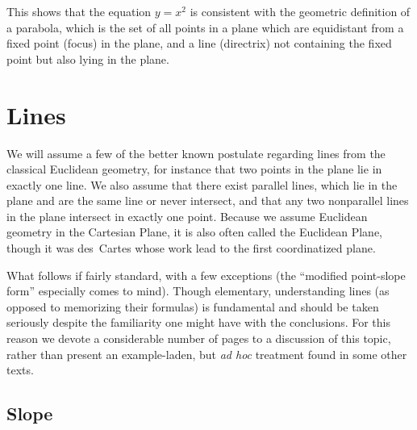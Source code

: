 This shows that the equation $y=x^2$ is consistent with the 
geometric definition of a parabola, which is the set of 
all points in a plane which are equidistant from a fixed
point (focus) in the plane, and a line (directrix) not containing
the fixed point but also lying in the plane.  
\ehw



\newpage
\section{Lines}
We will assume a few of the better known postulate regarding lines
from the classical Euclidean geometry, for instance that 
two points in the plane lie in exactly one line. We also assume that
there exist parallel lines, which lie in the
plane and are the same line or never intersect, and that any
two nonparallel lines in the plane intersect in exactly one point.
Because we assume Euclidean geometry in the Cartesian Plane,
it is also often called the Euclidean Plane, though it was
des~Cartes whose work lead to the  first coordinatized plane.

What follows if fairly standard, with a few
exceptions (the ``modified point-slope form''
especially comes to mind).  Though elementary, understanding lines
(as opposed to memorizing their formulas) is fundamental and 
should be taken seriously despite the familiarity one might
have with the conclusions.  For this reason we devote a considerable
number of pages to a discussion of this topic, rather than present
an example-laden, but  {\it ad hoc} treatment found in some other texts.


\subsection{Slope}

